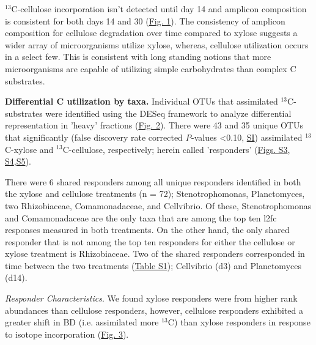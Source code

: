 $^{13}$C-cellulose incorporation isn't detected until day 14 and
amplicon composition is consistent for both days 14 and 30
(\href{https://www.authorea.com/users/3537/articles/3612/master/file/figures/ordination_all1/ordination_all1.png}{Fig.
1}). The consistency of amplicon composition for cellulose degradation over
time compared to xylose suggests a wider array of microorganisms utilize
xylose, whereas, cellulose utilization occurs in a select few. This is
consistent with long standing notions that more microorganisms are capable of
utilizing simple carbohydrates than complex C substrates. 



\textbf{Differential C utilization by taxa.} Individual OTUs that assimilated
$^{13}$C-substrates were identified using the DESeq framework
\citep{Anders_Huber_2010} to analyze differential representation in 'heavy'
fractions
(\href{https://www.authorea.com/users/3537/articles/3612/master/file/figures/l2fc_fig1/l2fc_fig.pdf}{Fig.
2}). There were 43 and 35 unique OTUs that significantly (false discovery rate
corrected \textit{P}-values \textless 0.10,
\href{https://authorea.com/users/3537/articles/8459/_show_article}{SI})
assimilated $^{13}$C-xylose and $^{13}$C-cellulose,
respectively; herein called 'responders'
(\href{https://www.authorea.com/users/3537/articles/8459/master/file/figures/OTU_screening_schematic/OTU_screening_schematic.pdf}{Figs.
S3},
\href{https://www.authorea.com/users/3537/articles/8459/master/file/figures/l2fc_fig_pVal/l2fc_fig_pVal.png}{S4},\href{https://authorea.com/users/3537/articles/8459/master/file/figures/manhattan/manhattan.png}{S5}).






There were 6 shared responders among all unique responders identified in both
the xylose and cellulose treatments (n = 72); Stenotrophomonas, Planctomyces,
two Rhizobiaceae, Comamonadaceae, and Cellvibrio. Of these, Stenotrophomonas
and Comamonadaceae are the only taxa that are among the top ten l2fc responses
measured in both treatments. On the other hand, the only shared responder that
is not among the top ten responders for either the cellulose or xylose
treatment is Rhizobiaceae. Two of the shared responders corresponded in time
between the two treatments
(\href{https://authorea.com/users/3537/articles/8459/master/file/figures/resp_table/resp_table.png}{Table
S1}); Cellvibrio (d3) and Planctomyces (d14).  

\textit{Responder Characteristics}.  We found xylose responders were from
higher rank abundances than cellulose responders, however, cellulose responders
exhibited a greater shift in BD (i.e. assimilated more $^{13}$C)
than xylose responders in response to isotope incorporation
(\href{https://authorea.com/users/3537/articles/3612/master/file/figures/shift_and_rabund2/shift_and_rabund2.png}{Fig.
3}). 

